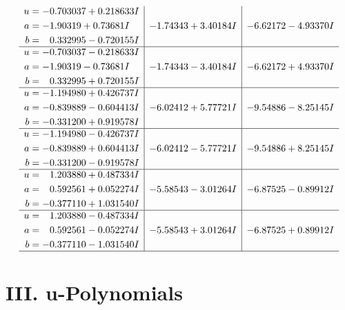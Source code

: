 \documentclass[1p]{elsarticle_modified}
\theoremstyle{definition}
\begin{document}
$$\begin{array}{c|c|c}
\begin{aligned}
u &= -0.703037 + 0.218633 I \\
a &= -1.90319 + 0.73681 I \\
b &= \phantom{-}0.332995 - 0.720155 I\end{aligned}
 & -1.74343 + 3.40184 I & -6.62172 - 4.93370 I \\ \hline\begin{aligned}
u &= -0.703037 - 0.218633 I \\
a &= -1.90319 - 0.73681 I \\
b &= \phantom{-}0.332995 + 0.720155 I\end{aligned}
 & -1.74343 - 3.40184 I & -6.62172 + 4.93370 I \\ \hline\begin{aligned}
u &= -1.194980 + 0.426737 I \\
a &= -0.839889 - 0.604413 I \\
b &= -0.331200 + 0.919578 I\end{aligned}
 & -6.02412 + 5.77721 I & -9.54886 - 8.25145 I \\ \hline\begin{aligned}
u &= -1.194980 - 0.426737 I \\
a &= -0.839889 + 0.604413 I \\
b &= -0.331200 - 0.919578 I\end{aligned}
 & -6.02412 - 5.77721 I & -9.54886 + 8.25145 I \\ \hline\begin{aligned}
u &= \phantom{-}1.203880 + 0.487334 I \\
a &= \phantom{-}0.592561 + 0.052274 I \\
b &= -0.377110 + 1.031540 I\end{aligned}
 & -5.58543 - 3.01264 I & -6.87525 - 0.89912 I \\ \hline\begin{aligned}
u &= \phantom{-}1.203880 - 0.487334 I \\
a &= \phantom{-}0.592561 - 0.052274 I \\
b &= -0.377110 - 1.031540 I\end{aligned}
 & -5.58543 + 3.01264 I & -6.87525 + 0.89912 I\\
 \hline 
 \end{array}$$\newpage
\newpage\renewcommand{\arraystretch}{1}
\centering \section*{ III. u-Polynomials}
\end{document}
